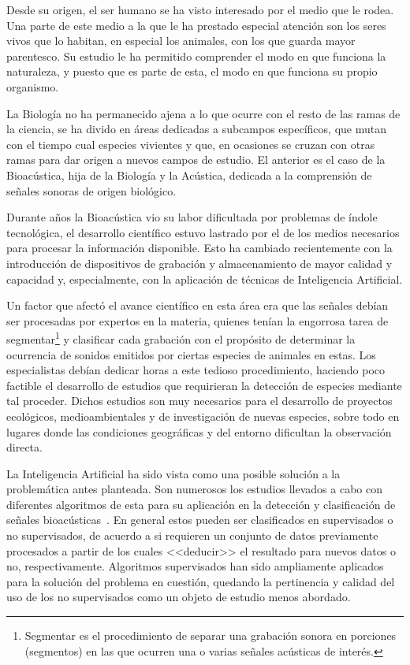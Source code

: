 
Desde su origen, el ser humano se ha visto interesado por el medio que le rodea.
Una parte de este medio a la que le ha prestado especial atención son los seres vivos que lo habitan, en especial los animales, con los que guarda mayor parentesco.
Su estudio le ha permitido comprender el modo en que funciona la naturaleza, y puesto que es parte de esta, el modo en que funciona su propio organismo.

La Biología no ha permanecido ajena a lo que ocurre con el resto de las ramas de la ciencia, se ha divido en áreas dedicadas a subcampos específicos, que mutan con el tiempo cual especies vivientes y que, en ocasiones se cruzan con otras ramas para dar origen a nuevos campos de estudio.
El anterior es el caso de la Bioacústica, hija de la Biología y la Acústica, dedicada a la comprensión de señales sonoras de origen biológico.

Durante años la Bioacústica vio su labor dificultada por problemas de índole tecnológica, el desarrollo científico estuvo lastrado por el de los medios necesarios para procesar la información disponible.
Esto ha cambiado recientemente con la introducción de dispositivos de grabación y almacenamiento de mayor calidad y capacidad y, especialmente, con la aplicación de técnicas de Inteligencia Artificial.

Un factor que afectó el avance científico en esta área era que las señales debían ser procesadas por expertos en la materia, quienes tenían la engorrosa tarea de segmentar\footnote{Segmentar es el procedimiento de separar una grabación sonora en porciones (segmentos) en las que ocurren una o varias señales acústicas de interés.} y clasificar cada grabación con el propósito de determinar la ocurrencia de sonidos emitidos por ciertas especies de animales en estas.
Los especialistas debían dedicar horas a este tedioso procedimiento, haciendo poco factible el desarrollo de estudios que requirieran la detección de especies mediante tal proceder.
Dichos estudios son muy necesarios para el desarrollo de proyectos ecológicos, medioambientales y de investigación de nuevas especies, sobre todo en lugares donde las condiciones geográficas y del entorno dificultan la observación directa.

La Inteligencia Artificial ha sido vista como una posible solución a la problemática antes planteada.
Son numerosos los estudios llevados a cabo con diferentes algoritmos de esta para su aplicación en la detección y clasificación de señales bioacústicas~\cite{Gerhard03}.
En general estos pueden ser clasificados en supervisados o no supervisados, de acuerdo a si requieren un conjunto de datos previamente procesados a partir de los cuales <<deducir>> el resultado para nuevos datos o no, respectivamente.
Algoritmos supervisados han sido ampliamente aplicados para la solución del problema en cuestión, quedando la pertinencia y calidad del uso de los no supervisados como un objeto de estudio menos abordado.

